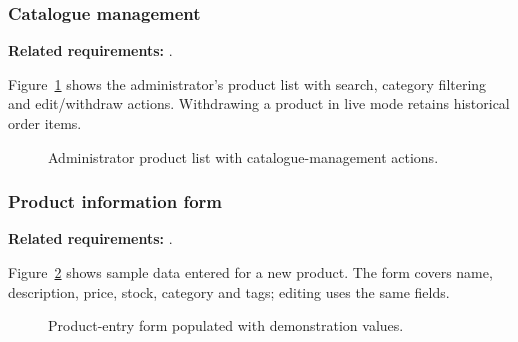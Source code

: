 \begin{samepage}
\subsubsection{Catalogue management}
\label{sec:prototype-admin-catalogue-view}

\textbf{Related requirements:} .

Figure~\ref{fig:prototype-admin-catalogue} shows the administrator's product
list with search, category filtering and edit/withdraw actions. Withdrawing a
product in live mode retains historical order items.

\nopagebreak[4]
\begin{figure}[H]
  \centering
  \caption{Administrator product list with catalogue-management actions.}
  \label{fig:prototype-admin-catalogue}
\end{figure}
\end{samepage}

\begin{samepage}
\subsubsection{Product information form}
\label{sec:prototype-product-form-view}

\textbf{Related requirements:} .

Figure~\ref{fig:prototype-product-form} shows sample data entered for a new
product. The form covers name, description, price, stock, category and tags;
editing uses the same fields.

\nopagebreak[4]
\begin{figure}[H]
  \centering
  \caption{Product-entry form populated with demonstration values.}
  \label{fig:prototype-product-form}
\end{figure}
\end{samepage}

